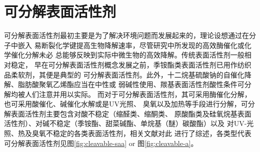 \documentclass[bachelor,winfonts]{jnuthesis} %
\begin{document}
    \section{可分解表面活性剂}
    可分解表面活性剂最初主要是为了解决环境问题而发展起来的，理论设想通过在分子中嵌入
    易断裂化学键提高生物降解速率，尽管研究中所发现的高效酶催化或化学催化分解未必
    总能够反映到实际中微生物的高效降解\cite{tehrani2007}。传统表面活性剂一般相对稳定，
    早在可分解表面活性剂概念发展之前，季铵酯类表面活性剂已用作纺织品柔软剂，其便是典型的
    可分解表面活性剂。此外，十二烷基硫酸钠的自催化降解、脂肪酸聚氧乙烯酯应当在中性或
    弱碱性使用、羰基表面活性剂酸性条件可分解均被人们注意并用以实际\cite{tehrani2007}。
    而对于可分解表面活性剂，其可采用酶催化分解，也可采用酸催化、碱催化水解或是UV光照、
    臭氧以及加热等手段进行分解，可分解表面活性剂主要包含对酸不稳定（缩醛类、缩酮类、
    原酸酯类及硅氧烷基表面活性剂）、对碱不稳定（季铵酯、甜菜碱酯、单烷基（醚）碳酸酯）以及
    对UV-光照、热及臭氧不稳定的各类表面活性剂，相关文献\cite{hellberg2000,tehrani2007,shukla2010,narayanan2008}对此
    进行了综述，各类型代表可分解表面活性剂见图\ref{fig:cleavable-saa} or 图\ref{fig:cleavable-a}。
    
    
\end{document}
